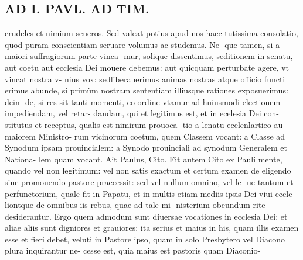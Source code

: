 \documentclass{article}
\begin{document}
\begin{pages}
\section*{AD I. PAVL. AD TIM. }
\marginpar{[ p.340 ]}\pstart crudeles et nimium seueros. Sed valeat potius apud nos haec tutissima consolatio, quod puram conscientiam seruare volumus ac studemus. Ne- que tamen, si a maiori suffragiorum parte vinca- mur, solique dissentimus, seditionem in senatu, aut coetu aut ecclesia Dei mouere debemus: aut quicquam perturbate agere, vt vincat nostra v- nius vox: sedliberauerimus animas nostras atque officio functi erimus abunde, si primùm nostram sententiam illiusque rationes exposuerimus: dein- de, si res sit tanti momenti, eo ordine vtamur ad huiusmodi electionem impediendam, vel retar- dandam, qui et legitimus est, et in ecelesia Dei con- stitutus et receptus, qualis est nimirum prouoca- tio a lenatu ecelenlartieo au maiorem Ministro- rum vicinorum coetum, quem Classem vocant: a Classe ad Synodum ipsam prouincialem: a Synodo prouinciali ad synodum Generalem et Nationa- lem quam vocant.  \pend\pstart Ait Paulus, Cito. Fit autem Cito ex Pauli mente, quando vel non legitimum: vel non satis exactum et certum examen de eligendo siue promouendo pastore praecessit: sed vel nullum omnino, vel le- ue tantum et perfunctorium, quale fit in Papatu, et in multis etiam mediis ipsis Dei viui eccle- liontque de omnibus iis rebus, quae ad tale mi- nisterium obeundum rite desiderantur. Ergo quem admodum sunt diuersae vocationes in ecclesia Dei: et aliae aliis sunt digniores et grauiores: ita serius et maius in his, quam illis examen esse et fieri debet, veluti in Pastore ipso, quam in solo Presbytero vel Diacono plura inquirantur ne- cesse est, quia maius est pastoris quam Diaconio-  \pend

\end{pages}
\end{document}
